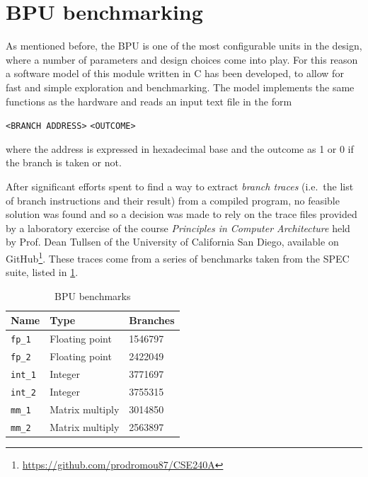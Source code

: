 \pagebreak
\section{\acs{BPU} benchmarking}
As mentioned before, the \ac{BPU} is one of the most configurable units in the design, where a number of parameters and design choices come into play. For this reason a software model of this module written in C has been developed, to allow for fast and simple exploration and benchmarking. The model implements the same functions as the hardware and reads an input text file in the form
\begin{center}
  \texttt{<BRANCH ADDRESS>}  \texttt{<OUTCOME>}
\end{center}
where the address is expressed in hexadecimal base and the outcome as 1 or 0 if the branch is taken or not.

After significant efforts spent to find a way to extract \emph{branch traces} (i.e.\ the list of branch instructions and their result) from a compiled program, no feasible solution was found and so a decision was made to rely on the trace files provided by a laboratory exercise of the course \emph{Principles in Computer Architecture} held by Prof. Dean Tullsen of the University of California San Diego, available on GitHub\footnote{\url{https://github.com/prodromou87/CSE240A}}. These traces come from a series of benchmarks taken from the SPEC suite, listed in \cref{tab:benchmarks}.
\begin{table}[hbt]
  \centering
  \begin{tabular}{lll}
    \toprule
    \textbf{Name}   & \textbf{Type}    & \textbf{Branches}  \\ \midrule
    \texttt{fp\_1}  & Floating point   & \num{1546797}      \\ \midrule
    \texttt{fp\_2}  & Floating point   & \num{2422049}      \\ \midrule
    \texttt{int\_1} & Integer          & \num{3771697}      \\ \midrule
    \texttt{int\_2} & Integer          & \num{3755315}      \\ \midrule
    \texttt{mm\_1}  & Matrix multiply  & \num{3014850}      \\ \midrule
    \texttt{mm\_2}  & Matrix multiply  & \num{2563897}      \\
    \bottomrule
  \end{tabular}
  \caption{\acs{BPU} benchmarks}
  \label{tab:benchmarks}
\end{table}

